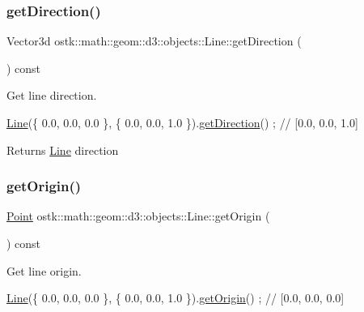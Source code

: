 \subsubsection{\texorpdfstring{get\+Direction()}{getDirection()}}
{\footnotesize\ttfamily Vector3d ostk\+::math\+::geom\+::d3\+::objects\+::\+Line\+::get\+Direction (\begin{DoxyParamCaption}{ }\end{DoxyParamCaption}) const}



Get line direction. 


\begin{DoxyCode}
\hyperlink{classostk_1_1math_1_1geom_1_1d3_1_1objects_1_1_line_a9ebdaaf67a4bd91780808f8683463ebe}{Line}(\{ 0.0, 0.0, 0.0 \}, \{ 0.0, 0.0, 1.0 \}).\hyperlink{classostk_1_1math_1_1geom_1_1d3_1_1objects_1_1_line_a7f312d93308a5f0a876d69c46662838b}{getDirection}() ; \textcolor{comment}{// [0.0, 0.0, 1.0]}
\end{DoxyCode}


\begin{DoxyReturn}{Returns}
\hyperlink{classostk_1_1math_1_1geom_1_1d3_1_1objects_1_1_line}{Line} direction 
\end{DoxyReturn}
\mbox{\label{classostk_1_1math_1_1geom_1_1d3_1_1objects_1_1_line_afc9e2dbb4641c031b91c4b8019a41b69}} 
\subsubsection{\texorpdfstring{get\+Origin()}{getOrigin()}}
{\footnotesize\ttfamily \hyperlink{classostk_1_1math_1_1geom_1_1d3_1_1objects_1_1_point}{Point} ostk\+::math\+::geom\+::d3\+::objects\+::\+Line\+::get\+Origin (\begin{DoxyParamCaption}{ }\end{DoxyParamCaption}) const}



Get line origin. 


\begin{DoxyCode}
\hyperlink{classostk_1_1math_1_1geom_1_1d3_1_1objects_1_1_line_a9ebdaaf67a4bd91780808f8683463ebe}{Line}(\{ 0.0, 0.0, 0.0 \}, \{ 0.0, 0.0, 1.0 \}).\hyperlink{classostk_1_1math_1_1geom_1_1d3_1_1objects_1_1_line_afc9e2dbb4641c031b91c4b8019a41b69}{getOrigin}() ; \textcolor{comment}{// [0.0, 0.0, 0.0]}
\end{DoxyCode}


